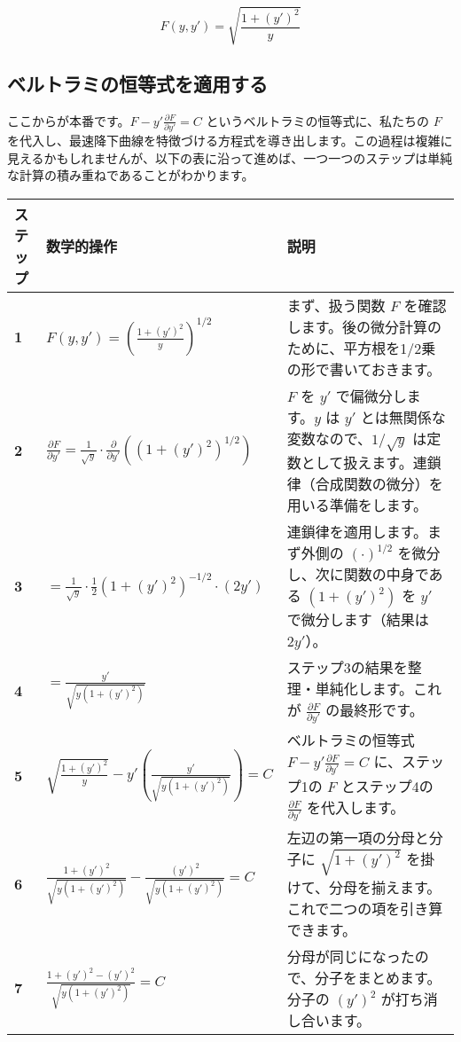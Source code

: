 \documentclass[12pt,a4paper]{ltjsarticle}
\begin{document}
\begin{equation}
F(y,y') = \sqrt{\frac{1 + (y')^2}{y}}
\end{equation}

\subsection{ベルトラミの恒等式を適用する}

ここからが本番です。$F - y' \frac{\partial F}{\partial y'} = C$ というベルトラミの恒等式に、私たちの $F$ を代入し、最速降下曲線を特徴づける方程式を導き出します。この過程は複雑に見えるかもしれませんが、以下の表に沿って進めば、一つ一つのステップは単純な計算の積み重ねであることがわかります。

\begin{longtable}{|p{1.2cm}|p{5.5cm}|p{6.5cm}|}
\hline
\textbf{ステップ} & \textbf{数学的操作} & \textbf{説明} \\
\hline
\textbf{1} & $F(y, y') = \left( \frac{1+(y')^2}{y} \right)^{1/2}$ & まず、扱う関数 $F$ を確認します。後の微分計算のために、平方根を1/2乗の形で書いておきます。 \\
\hline
\textbf{2} & $\frac{\partial F}{\partial y'} = \frac{1}{\sqrt{y}} \cdot \frac{\partial}{\partial y'} \left( (1+(y')^2)^{1/2} \right)$ & $F$ を $y'$ で偏微分します。$y$ は $y'$ とは無関係な変数なので、$1/\sqrt{y}$ は定数として扱えます。連鎖律（合成関数の微分）を用いる準備をします。 \\
\hline
\textbf{3} & $= \frac{1}{\sqrt{y}} \cdot \frac{1}{2} (1+(y')^2)^{-1/2} \cdot (2y')$ & 連鎖律を適用します。まず外側の $(\cdot)^{1/2}$ を微分し、次に関数の中身である $(1+(y')^2)$ を $y'$ で微分します（結果は $2y'$）。 \\
\hline
\textbf{4} & $= \frac{y'}{\sqrt{y(1+(y')^2)}}$ & ステップ3の結果を整理・単純化します。これが $\frac{\partial F}{\partial y'}$ の最終形です。 \\
\hline
\textbf{5} & $\sqrt{\frac{1+(y')^2}{y}} - y' \left( \frac{y'}{\sqrt{y(1+(y')^2)}} \right) = C$ & ベルトラミの恒等式 $F - y' \frac{\partial F}{\partial y'} = C$ に、ステップ1の $F$ とステップ4の $\frac{\partial F}{\partial y'}$ を代入します。 \\
\hline
\textbf{6} & $\frac{1+(y')^2}{\sqrt{y(1+(y')^2)}} - \frac{(y')^2}{\sqrt{y(1+(y')^2)}} = C$ & 左辺の第一項の分母と分子に $\sqrt{1+(y')^2}$ を掛けて、分母を揃えます。これで二つの項を引き算できます。 \\
\hline
\textbf{7} & $\frac{1+(y')^2 - (y')^2}{\sqrt{y(1+(y')^2)}} = C$ & 分母が同じになったので、分子をまとめます。分子の $(y')^2$ が打ち消し合います。 \\

\end{longtable}
\end{document}
